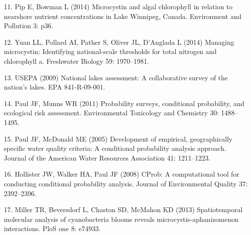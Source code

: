 \documentclass[10pt,a4paper,twocolumn]{article}
\begin{document}
11. Pip E, Bowman L (2014) Microcystin and algal chlorophyll in relation
to nearshore nutrient concentrations in Lake Winnipeg, Canada.
Environment and Pollution 3: p36.

12. Yuan LL, Pollard AI, Pather S, Oliver JL, D'Anglada L (2014)
Managing microcystin: Identifying national-scale thresholds for total
nitrogen and chlorophyll a. Freshwater Biology 59: 1970--1981.

13. USEPA (2009) National lakes assessment: A collaborative survey of
the nation's lakes. EPA 841-R-09-001.

14. Paul JF, Munns WR (2011) Probability surveys, conditional
probability, and ecological risk assessment. Environmental Toxicology
and Chemistry 30: 1488--1495.

15. Paul JF, McDonald ME (2005) Development of empirical, geographically
specific water quality criteria: A conditional probability analysis
approach. Journal of the American Water Resources Association 41:
1211--1223.

16. Hollister JW, Walker HA, Paul JF (2008) CProb: A computational tool
for conducting conditional probability analysis. Journal of
Environmental Quality 37: 2392--2396.

17. Miller TR, Beversdorf L, Chaston SD, McMahon KD (2013)
Spatiotemporal molecular analysis of cyanobacteria blooms reveals
microcystis-aphanizomenon interactions. PloS one 8: e74933.
\end{document}
